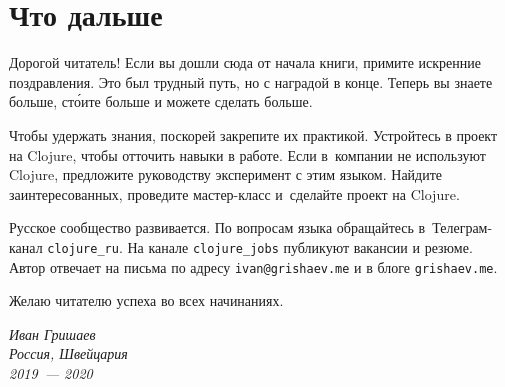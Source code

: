 \chapter{Что дальше}

Дорогой читатель! Если вы дошли сюда от начала книги, примите искренние
поздравления. Это был трудный путь, но с наградой в конце. Теперь вы знаете
больше, ст\'{о}ите больше и можете сделать больше.

Чтобы удержать знания, поскорей закрепите их практикой. Устройтесь в проект на
Clojure, чтобы отточить навыки в работе. Если в~компании не используют Clojure,
предложите руководству эксперимент с этим языком. Найдите заинтересованных,
проведите мастер-класс и~сделайте проект на Clojure.

Русское сообщество развивается. По вопросам языка обращайтесь в~Телеграм-канал
\verb|clojure_ru|. На канале \verb|clojure_jobs| публикуют вакансии и
резюме. Автор отвечает на письма по адресу \verb|ivan@grishaev.me| и в блоге
\verb|grishaev.me|.

Желаю читателю успеха во всех начинаниях.

\vspace{1em}

\noindent
\textit{Иван Гришаев\\Россия, Швейцария\\2019~--- 2020}

